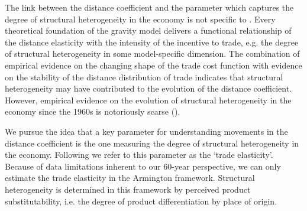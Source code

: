 \documentclass[12pt,twoside,a4paper,notitlepage]{article}
\begin{document}
The link between the distance coefficient and the parameter which captures the degree of structural heterogeneity in the economy is not specific to \cite{Chaney2016}. Every theoretical foundation of the gravity model delivers a functional relationship of the distance elasticity with the intensity of the incentive to trade, e.g. the degree of structural heterogeneity in some model-specific dimension. The combination of empirical evidence on the changing shape of the trade cost function with evidence on the stability of the distance distribution of trade indicates that structural heterogeneity may have contributed to the evolution of the distance coefficient. However, empirical evidence on the evolution of structural heterogeneity in the economy since the 1960s is notoriously scarse (\cite{Head2013}).

We pursue the idea that a key parameter for understanding movements in the distance coefficient is the one measuring the degree of structural heterogeneity in the economy. Following \cite{Arkolakis2012} we refer to this parameter as the `trade elasticity'. 
Because of data limitations inherent to our 60-year perspective, we can only estimate the trade elasticity in the Armington framework. Structural heterogeneity is determined in this framework by perceived product substitutability, i.e. the degree of product differentiation by place of origin.
\end{document}
